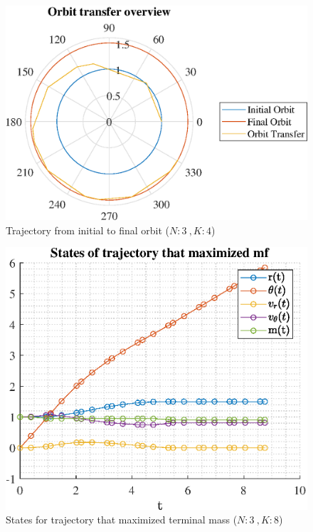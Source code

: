 \documentclass[]{article}
\begin{document}
	\begin{figure}
		\centering
		\includegraphics[scale=0.75]{orbit_N3_K4_C3_mf.eps}
		\caption{Trajectory from initial to final orbit (\(N:3\ , K:4\))}
		\label{fig:orbit_N3_K4_C3_mf}
	\end{figure}
	\begin{figure}
		\centering
		\includegraphics[scale=0.75]{states_N3_K8_C3_mf.eps}
		\caption{States for trajectory that maximized terminal mass (\(N:3\ , K:8\))}
		\label{fig:states_N3_K8_C3_mf}
	\end{figure}
\end{document}
